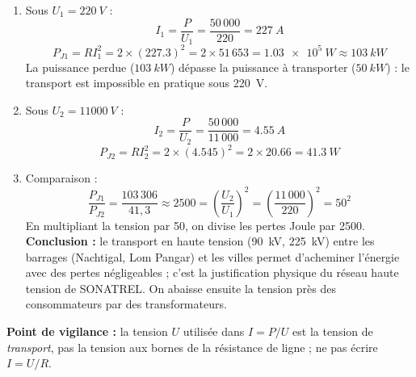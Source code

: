 \documentclass[11pt]{article}
\begin{document}
\begin{corrige}
\begin{enumerate}
\item Sous $U_1 = \SI{220}{V}$ :
\[
I_1 = \frac{P}{U_1} = \frac{50\,000}{220} = \SI{227}{A}
\]
\[
P_{J1} = R I_1^2 = 2 \times (\num{227,3})^2 = 2 \times 51\,653 = \SI{1,03e5}{W} \approx \SI{103}{kW}
\]
La puissance perdue ($\SI{103}{kW}$) dépasse la puissance à transporter ($\SI{50}{kW}$) : le transport est impossible en pratique sous \SI{220}{V}.
\item Sous $U_2 = \SI{11000}{V}$ :
\[
I_2 = \frac{P}{U_2} = \frac{50\,000}{11\,000} = \SI{4,55}{A}
\]
\[
P_{J2} = R I_2^2 = 2 \times (\num{4,545})^2 = 2 \times \num{20,66} = \SI{41,3}{W}
\]
\item Comparaison :
\[
\frac{P_{J1}}{P_{J2}} = \frac{103\,306}{41,3} \approx 2500 = \left(\frac{U_2}{U_1}\right)^2 = \left(\frac{11\,000}{220}\right)^2 = 50^2
\]
En multipliant la tension par 50, on divise les pertes Joule par 2500. \textbf{Conclusion :} le transport en haute tension (\SI{90}{kV}, \SI{225}{kV}) entre les barrages (Nachtigal, Lom Pangar) et les villes permet d'acheminer l'énergie avec des pertes négligeables ; c'est la justification physique du réseau haute tension de SONATREL. On abaisse ensuite la tension près des consommateurs par des transformateurs.
\end{enumerate}
\textbf{Point de vigilance :} la tension $U$ utilisée dans $I = P/U$ est la tension de \emph{transport}, pas la tension aux bornes de la résistance de ligne ; ne pas écrire $I = U/R$.
\end{corrige}
\end{document}
